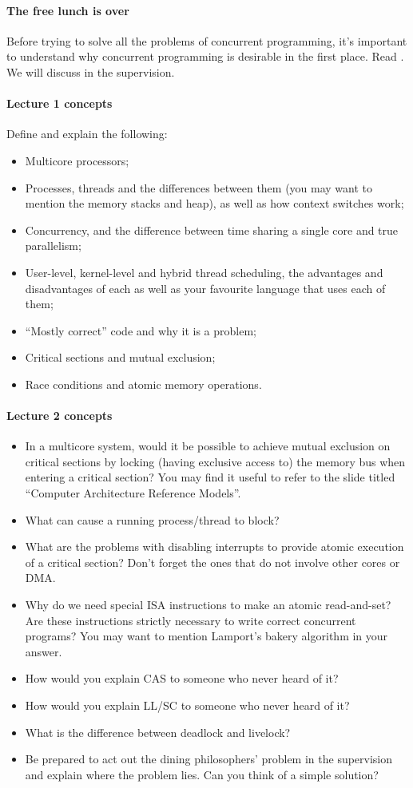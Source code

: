 \documentclass[12pt,a4paper,oneside,openright]{report}
\newcommand{\question}[2]{\paragraph{#1} #2}
\begin{document}
\question{The free lunch is over}{Before trying to solve all the
  problems of concurrent programming, it's important to understand why
  concurrent programming is desirable in the first place. Read
  \cite{FreeLunchIsOver}. We will discuss in the supervision.}

\question{Lecture 1 concepts}{Define and explain the following:
  \begin{itemize}
  \item Multicore processors;
  \item Processes, threads and the differences between them (you may
    want to mention the memory stacks and heap), as well as how
    context switches work;
  \item Concurrency, and the difference between time sharing a single
    core and true parallelism;
  \item User-level, kernel-level and hybrid thread scheduling, the
    advantages and disadvantages of each as well as your favourite
    language that uses each of them;
  \item ``Mostly correct'' code and why it is a problem;
  \item Critical sections and mutual exclusion;
  \item Race conditions and atomic memory operations.
  \end{itemize}
}

\question{Lecture 2 concepts}{
  \begin{itemize}
  \item In a multicore system, would it be possible to achieve mutual
    exclusion on critical sections by locking (having exclusive access
    to) the memory bus when entering a critical section? You may find
    it useful to refer to the slide titled ``Computer Architecture
    Reference Models''.
  \item What can cause a running process/thread to block?
  \item What are the problems with disabling interrupts to provide
    atomic execution of a critical section? Don't forget the ones that
    do not involve other cores or DMA.
  \item Why do we need special ISA instructions to make an atomic
    read-and-set? Are these instructions strictly necessary to write
    correct concurrent programs? You may want to mention Lamport's
    bakery algorithm in your answer.
  \item How would you explain CAS to someone who never heard of it?
  \item How would you explain LL/SC to someone who never heard of it?
  \item What is the difference between deadlock and livelock?
  \item Be prepared to act out the dining philosophers' problem in the
    supervision and explain where the problem lies. Can you think of a
    simple solution?
  \end{itemize}
}
\end{document}
